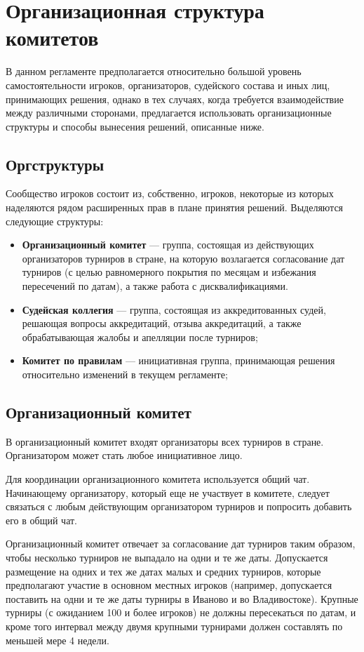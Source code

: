 \section{Организационная структура комитетов}

В данном регламенте предполагается относительно большой уровень самостоятельности игроков, организаторов, судейского состава и иных лиц, принимающих решения, однако в тех случаях, когда требуется взаимодействие между различными сторонами, предлагается использовать организационные структуры и способы вынесения решений, описанные ниже.

\subsection{Оргструктуры}

Сообщество игроков состоит из, собственно, игроков, некоторые из которых наделяются рядом расширенных прав в плане принятия решений. Выделяются следующие структуры:

\begin{itemize}
	\item \textbf{Организационный комитет} --- группа, состоящая из действующих организаторов турниров в стране, на которую возлагается согласование дат турниров (с целью равномерного покрытия по месяцам и избежания пересечений по датам), а также работа с дисквалификациями.
	\item \textbf{Судейская коллегия} --- группа, состоящая из аккредитованных судей, решающая вопросы аккредитаций, отзыва аккредитаций, а также обрабатывающая жалобы и апелляции после турниров;
	\item \textbf{Комитет по правилам} --- инициативная группа, принимающая решения относительно изменений в текущем регламенте;
\end{itemize}

\subsection{Организационный комитет}

В организационный комитет входят организаторы всех турниров в стране. Организатором может стать любое инициативное лицо. 

Для координации организационного комитета используется общий чат. Начинающему организатору, который еще не участвует в комитете, следует связаться с любым действующим организатором турниров и попросить добавить его в общий чат.

Организационный комитет отвечает за согласование дат турниров таким образом, чтобы несколько турниров не выпадало на одни и те же даты. Допускается размещение на одних и тех же датах малых и средних турниров, которые предполагают участие в основном местных игроков (например, допускается поставить на одни и те же даты турниры в Иваново и во Владивостоке). Крупные турниры (с ожиданием 100 и более игроков) не должны пересекаться по датам, и кроме того интервал между двумя крупными турнирами должен составлять по меньшей мере 4 недели.

